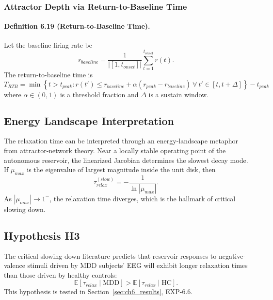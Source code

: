 \subsubsection{Attractor Depth via Return-to-Baseline Time}

\paragraph{Definition 6.19 (Return-to-Baseline Time).}
Let the baseline firing rate be
\begin{equation}
r_{baseline}=\frac{1}{|[1,t_{onset}]|}\sum_{t=1}^{t_{onset}} r(t).
\end{equation}
The return-to-baseline time is
\begin{equation}
T_{RTB}=\min\left\{t>t_{peak}: r(t')\le r_{baseline}+\alpha(r_{peak}-r_{baseline})\ \forall\ t'\in[t,t+\Delta]\right\}-t_{peak}
\end{equation}
where $\alpha\in(0,1)$ is a threshold fraction and $\Delta$ is a sustain window.

\subsection{Energy Landscape Interpretation}

The relaxation time can be interpreted through an energy-landscape metaphor from attractor-network theory. Near a locally stable operating point of the autonomous reservoir, the linearized Jacobian determines the slowest decay mode. If $\mu_{max}$ is the eigenvalue of largest magnitude inside the unit disk, then
\begin{equation}
\tau_{relax}^{(slow)} = -\frac{1}{\ln|\mu_{max}|}.
\end{equation}
As $|\mu_{max}|\rightarrow 1^{-}$, the relaxation time diverges, which is the hallmark of critical slowing down.

\subsection{Hypothesis H3}
The critical slowing down literature predicts that reservoir responses to negative-valence stimuli driven by MDD subjects' EEG will exhibit longer relaxation times than those driven by healthy controls:
\begin{equation}
\mathbb{E}[\tau_{relax}\mid \mathrm{MDD}] > \mathbb{E}[\tau_{relax}\mid \mathrm{HC}].
\end{equation}
This hypothesis is tested in Section~\ref{sec:ch6_results}, EXP-6.6.

